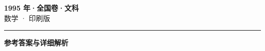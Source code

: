 \documentclass[zihao=5, a4paper]{ctexart}
\begin{document}
\begin{center}
  {\Large\bfseries 1995 年·全国卷·文科}\\[4pt]
  {\large 数学 · 印刷版}
\end{center}
\medskip
{}

\par\bigskip\hrule\bigskip
{}
\begin{center}{\large\bfseries 参考答案与详细解析}\end{center}
\smallskip

\end{document}
